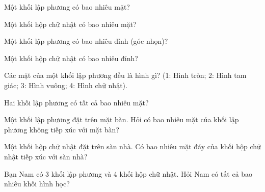 \begin{ex}
Một khối lập phương có bao nhiêu mặt?
\end{ex}

\begin{ex}
Một khối hộp chữ nhật có bao nhiêu mặt?
\end{ex}

\begin{ex}
Một khối lập phương có bao nhiêu đỉnh (góc nhọn)?
\end{ex}

\begin{ex}
Một khối hộp chữ nhật có bao nhiêu đỉnh?
\end{ex}

\begin{ex}
Các mặt của một khối lập phương đều là hình gì? (1: Hình tròn; 2: Hình tam giác; 3: Hình vuông; 4: Hình chữ nhật).
\end{ex}

\begin{ex}
Hai khối lập phương có tất cả bao nhiêu mặt?
\end{ex}

\begin{ex}
Một khối lập phương đặt trên mặt bàn. Hỏi có bao nhiêu mặt của khối lập phương không tiếp xúc với mặt bàn?
\end{ex}

\begin{ex}
Một khối hộp chữ nhật đặt trên sàn nhà. Có bao nhiêu mặt đáy của khối hộp chữ nhật tiếp xúc với sàn nhà?
\end{ex}

\begin{ex}
Bạn Nam có 3 khối lập phương và 4 khối hộp chữ nhật. Hỏi Nam có tất cả bao nhiêu khối hình học?
\end{ex}


